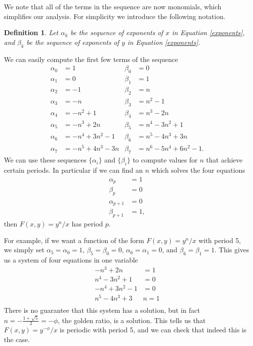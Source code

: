 \documentclass[12pt]{article}
\newtheorem{definition}{Definition}
\begin{document}
We note that all of the terms in the sequence are now monomials, which simplifies our analysis. For simplicity we introduce the following notation.
\begin{definition} 
Let $\alpha_k$ be the sequence of exponents of $x$ in Equation \ref{exponents}, and $\beta_k$ be the sequence of exponents of $y$ in Equation \ref{exponents}.
\end{definition}
We can easily compute the first few terms of the sequence
\begin{align*}
\alpha_0 &= 1  &\beta_0& = 0\\
\alpha_1 &= 0 &\beta_1& = 1\\
\alpha_2 &= -1  &\beta_2& = n\\
\alpha_3 &= -n &\beta_3& = n^2-1\\
\alpha_4 &= -n^2+1 &\beta_4& = n^3-2n\\
\alpha_5 &= -n^3+2n &\beta_5& =n^4-3n^2+1\\ 
\alpha_6 &= -n^4+3n^2 -1 &\beta_6& =n^5-4n^3+3n \\ 
\alpha_7 &= -n^5+4n^3 - 3n &\beta_7& =n^6-5n^4+6n^2 - 1.
\end{align*}
We can use these sequences $\{\alpha_i\}$ and $\{\beta_i\}$ to compute values for $n$ that achieve certain periods. In particular if we can find an $n$ which solves the four equations 
\begin{align*}
\alpha_p &= 1 \\
\beta_p &=0\\
\alpha_{p+1} &=  0\\
\beta_{p+1}&=1,
\end{align*}
then $F(x,y)=y^n/x$ has period $p$. 

For example, if we want a function of the form $F(x,y) = y^n/x$ with period 5, we simply set $\alpha_5 = \alpha_0 = 1$, $\beta_5 = \beta_0 = 0$, $\alpha_6 = \alpha_1 = 0$, and $\beta_6 = \beta_1 = 1$. This gives us a system of four equations in one variable
\begin{align*}
-n^3+2n &= 1\\
n^4-3n^2+1&=0\\
-n^4+3n^2 -1&= 0\\
n^5-4n^3+3&n=1\\
\end{align*}
There is no guarantee that this system has a solution, but in fact $n = -\frac{1+\sqrt{5}}{2} = -\phi$, the golden ratio, is a solution. This tells us that $F(x,y) = y^{-\phi}/x$ is periodic with period 5, and we can check that indeed this is the case.
\end{document}
